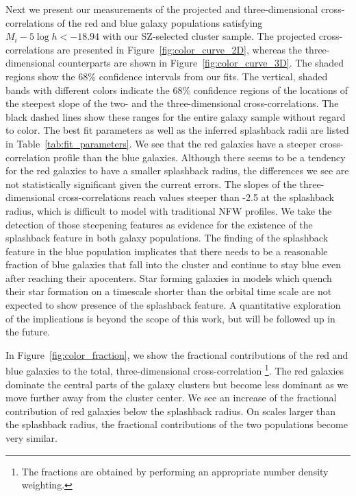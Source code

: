 \documentclass[iop, apjl, twocolappendix, numberedappendix]{emulateapj}
\begin{document}
Next we present our measurements of the projected and
three-dimensional cross-correlations of the red and blue galaxy populations
satisfying $M_{i}-5\log h<-18.94$ with our SZ-selected cluster
sample. The projected cross-correlations are presented in Figure~\ref{fig:color_curve_2D},
whereas the three-dimensional counterparts are shown in 
Figure~\ref{fig:color_curve_3D}. The shaded regions show
the 68\% confidence intervals from our fits. The vertical, shaded
bands with different colors indicate the 68\% confidence regions of
the locations of the steepest slope of the two- and the
three-dimensional cross-correlations. The black dashed lines show
these ranges for the entire galaxy sample without regard to color.
The best fit parameters as well as the inferred splashback radii are
listed in Table~\ref{tab:fit_parameters}. We
see that the red galaxies have a steeper cross-correlation profile
than the blue galaxies. Although there seems to be  a tendency for the red
galaxies to have a smaller splashback radius, the differences we see
are not statistically significant given the current errors. The
slopes of the three-dimensional cross-correlations reach values
steeper than -2.5 at the splashback radius, which is difficult to model with
traditional NFW profiles. We take the detection of those steepening features 
as evidence for the existence of the splashback feature in both galaxy populations.
The finding of the splashback feature in the blue population implicates that
there needs to be a reasonable fraction of blue galaxies that fall
into the cluster and continue to stay blue even after reaching their
apocenters. Star forming galaxies in models which quench their star
formation on a timescale shorter than the orbital time scale are
not expected to show presence of the splashback feature. A
quantitative exploration of the implications is beyond the scope of
this work, but will be followed up in the future.

In Figure~\ref{fig:color_fraction}, we show the fractional
contributions of the red and blue galaxies to the total,
three-dimensional cross-correlation \footnote{The fractions are
obtained by performing an appropriate number density weighting.}.
The red galaxies dominate the central parts of the galaxy clusters
but become less dominant as we move further away from the cluster center.
We see an increase of the fractional contribution of
red galaxies below the splashback radius. On scales larger than the
splashback radius, the fractional contributions of the two populations become
very similar.
\end{document}
